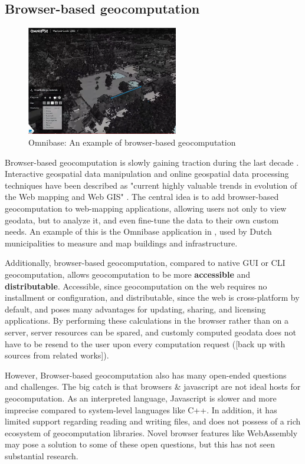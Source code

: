 \subsection*{Browser-based geocomputation}

\begin{figure}
  \centering
  \graphicspath{ {../../assets/images/background/geo-web/} }
  \includegraphics[width=250px]{omnibase.png}
  \caption{Omnibase: An example of browser-based geocomputation}
  \label{fig:1:omnibase}
\end{figure}

Browser-based \ac{geocomputation} is slowly gaining traction during the last decade \cite{kulawiak_analysis_2019, panidi_hybrid_2015, hamilton_client-side_2014}. 
Interactive geospatial data manipulation and online geospatial data processing techniques have been described as "current highly valuable trends in evolution of the Web mapping and Web GIS" \cite{panidi_hybrid_2015}. 
The central idea is to add browser-based geocomputation to web-mapping applications, allowing users not only to view geodata, but to analyze it, and even fine-tune the data to their own custom needs.
An example of this is the Omnibase application in , used by Dutch municipalities to measure and map buildings and infrastructure.

Additionally, browser-based geocomputation, compared to native GUI or CLI geocomputation, allows geocomputation to be more \textbf{accessible} and \textbf{distributable}. 
Accessible, since geocomputation on the web requires no installment or configuration, 
and distributable, since the web is cross-platform by default, and poses many advantages for updating, sharing, and licensing applications. 
By performing these calculations in the browser rather than on a server, server resources can be spared, and customly computed geodata does not have to be resend to the user upon every computation request ([back up with sources from related works]).

However, Browser-based geocomputation also has many open-ended questions and challenges. 
The big catch is that browsers \& javascript are not ideal hosts for geocomputation. 
As an interpreted language, Javascript is slower and more imprecise compared to system-level languages like C++.
In addition, it has limited support regarding reading and writing files, and does not possess of a rich ecosystem of geocomputation libraries.  
Novel browser features like WebAssembly may pose a solution to some of these open questions, but this has not seen substantial research. 

